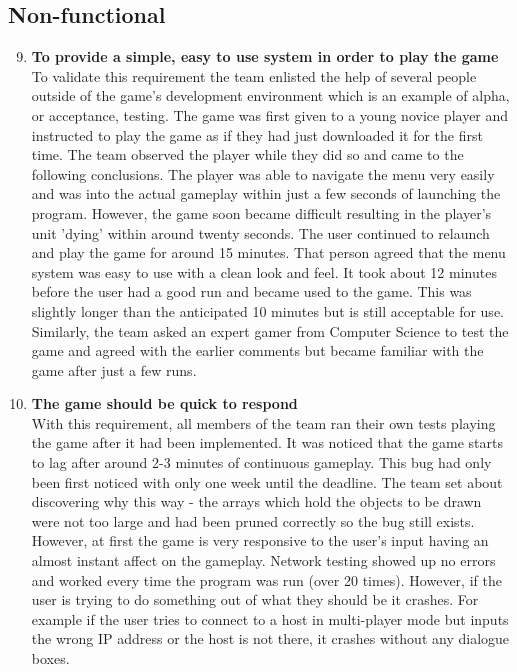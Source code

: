 \subsection{Non-functional}
\begin{enumerate}
\setcounter{enumi}{8}
\item \textbf{To provide a simple, easy to use system in order to play the game}\\
To validate this requirement the team enlisted the help of several people outside of the game's development environment which is an example of alpha, or acceptance, testing. The game was first given to a young novice player and instructed to play the game as if they had just downloaded it for the first time. The team observed the player while they did so and came to the following conclusions. The player was able to navigate the menu very easily and was into the actual gameplay within just a few seconds of launching the program. However, the game soon became difficult resulting in the player's unit 'dying' within around twenty seconds. The user continued to relaunch and play the game for around 15 minutes. That person agreed that the menu system was easy to use with a clean look and feel. It took about 12 minutes before the user had a good run and became used to the game. This was slightly longer than the anticipated 10 minutes but is still acceptable for use.\\ Similarly, the team asked an expert gamer from Computer Science to test the game and agreed with the earlier comments but became familiar with the game after just a few runs.
\item \textbf{The game should be quick to respond}\\
With this requirement, all members of the team ran their own tests playing the game after it had been implemented. It was noticed that the game starts to lag after around 2-3 minutes of continuous gameplay. This bug had only been first noticed with only one week until the deadline. The team set about discovering why this way - the arrays which hold the objects to be drawn were not too large and had been pruned correctly so the bug still exists. However, at first the game is very responsive to the user's input having an almost instant affect on the gameplay. Network testing showed up no errors and worked every time the program was run (over 20 times). However, if the user is trying to do something out of what they should be it crashes. For example if the user tries to connect to a host in multi-player mode but inputs the wrong IP address or the host is not there, it crashes without any dialogue boxes.

\end{enumerate}
